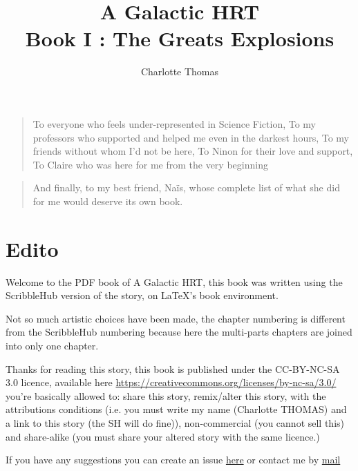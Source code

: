 \documentclass[colorlinks,12pt,a4paper]{book}
\title{A Galactic HRT \\ Book I : The Greats Explosions}
\author{Charlotte Thomas}
\newenvironment{dedication}
    {\vspace{6ex}\begin{quotation}\begin{em}}
    {\par\end{em}\end{quotation}}
\begin{document}
    \maketitle
    \begin{dedication}
      To everyone who feels under-represented in Science Fiction,\newline
      To my professors who supported and helped me even in the darkest hours,\newline
      To my friends without whom I'd not be here,\newline
      To Ninon for their love and support,\newline
      To Claire who was here for me from the very beginning
    \end{dedication}

    \begin{dedication}
      \begin{center}
      And finally, to my best friend, Naïs, whose complete list of what she did for me would deserve its own book.
      \end{center}
    \end{dedication}
    
    \tableofcontents
    
    \chapter*{Edito}
    Welcome to the PDF book of A Galactic HRT, this book was written using the ScribbleHub version of the story, on \LaTeX's book 
    environment.\par 
    \bigskip
    Not so much artistic choices have been made, the chapter numbering is different from the ScribbleHub numbering 
    because here the multi-parts chapters are joined into only one chapter.
    \par
    \bigskip 
    Thanks for reading this story, this book is published under the CC-BY-NC-SA 3.0 licence, available here 
    \url{https://creativecommons.org/licenses/by-nc-sa/3.0/}
    you're basically allowed to: share this story, remix/alter this story, with the attributions conditions (i.e. you must 
    write my name (Charlotte THOMAS) and a link to this story (the SH will do fine)), non-commercial (you cannot 
    sell this) and share-alike (you must share your altered story with the same licence.)\par
    \bigskip

    If you have any suggestions you can create an issue \href{https://github.com/coco33920/agh-public}{here} or contact me by 
    \href{mailto:contact@nwa2coco.fr}{mail}\par 
    \bigskip
\end{document}
